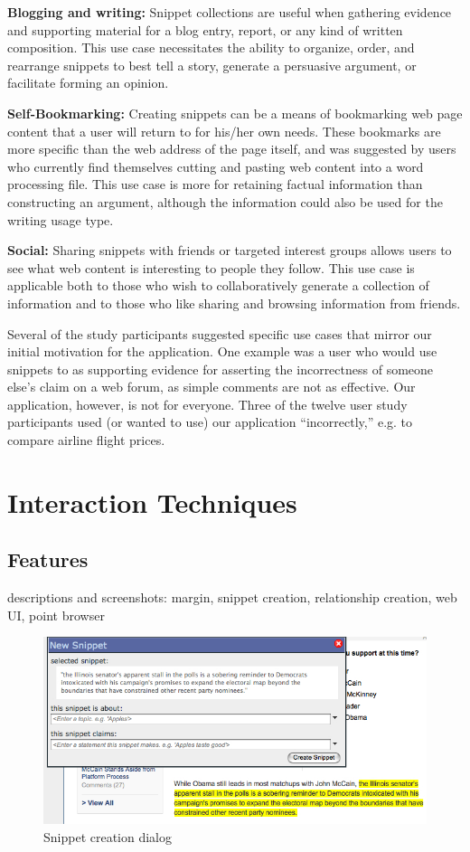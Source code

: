 \documentclass{chi2009}
\begin{document}
\textbf{Blogging and writing:} Snippet collections are useful when gathering evidence and supporting material for a blog entry, report, or any kind of written composition. This use case necessitates the ability to organize, order, and rearrange snippets to best tell a story, generate a persuasive argument, or facilitate forming an opinion.

\textbf{Self-Bookmarking:} Creating snippets can be a means of bookmarking web page content that a user will return to for his/her own needs. These bookmarks are more specific than the web address of the page itself, and was suggested by users who currently find themselves cutting and pasting web content into a word processing file. This use case is more for retaining factual information than constructing an argument, although the information could also be used for the writing usage type.

\textbf{Social:} Sharing snippets with friends or targeted interest groups allows users to see what web content is interesting to people they follow. This use case is applicable both to those who wish to collaboratively generate a collection of information and to those who like sharing and browsing information from friends.

Several of the study participants suggested specific use cases that mirror our initial motivation for the application. One example was a user who would use snippets to as supporting evidence for asserting the incorrectness of someone else's claim on a web forum, as simple comments are not as effective. Our application, however, is not for everyone. Three of the twelve user study participants used (or wanted to use) our application ``incorrectly,'' e.g. to compare airline flight prices.


\section{Interaction Techniques}

\subsection{Features}
descriptions and screenshots: margin, snippet creation, relationship creation, web UI, point browser
\begin{figure}[ht]
	\includegraphics[scale=0.35]{../screenshots/snippetdialog_sm.jpg}
	\caption{Snippet creation dialog}
	\label{snippetdialog}
\end{figure}
\end{document}
